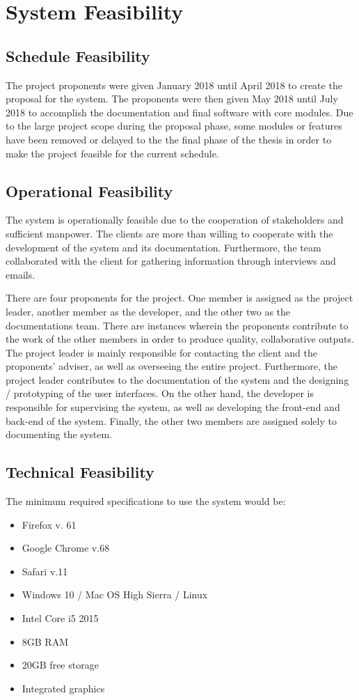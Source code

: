 \section{System Feasibility}

\subsection{Schedule Feasibility}
The project proponents were given January 2018 until April 2018 to create the proposal for the system. The proponents were then given May 2018 until July 2018 to accomplish the documentation and final software with core modules. Due to the large project scope during the proposal phase, some modules or features have been removed or delayed to the the final phase of the thesis in order to make the project feasible for the current schedule.

\subsection{Operational Feasibility}
The system is operationally feasible due to the cooperation of stakeholders and sufficient manpower. The clients are more than willing to cooperate with the development of the system and its documentation. Furthermore, the team collaborated with the client for gathering information through interviews and emails.

There are four proponents for the project. One member is assigned as the project leader, another member as the developer, and the other two as the documentations team. There are instances wherein the proponents contribute to the work of the other members in order to produce quality, collaborative outputs. The project leader is mainly responsible for contacting the client and the proponents' adviser, as well as overseeing the entire project. Furthermore, the project leader contributes to the documentation of the system and the designing / prototyping of the user interfaces. On the other hand, the developer is responsible for supervising the system, as well as developing the front-end and back-end of the system. Finally, the other two members are assigned solely to documenting the system.

\subsection{Technical Feasibility}
The minimum required specifications to use the system would be:
\begin{itemize}
    \item{Firefox v. 61}
    \item{Google Chrome v.68}
    \item{Safari v.11}
    \item{Windows 10 / Mac OS High Sierra / Linux}
    \item{Intel Core i5 2015}
    \item{8GB RAM}
    \item{20GB free storage}
    \item{Integrated graphics}
\end{itemize}

